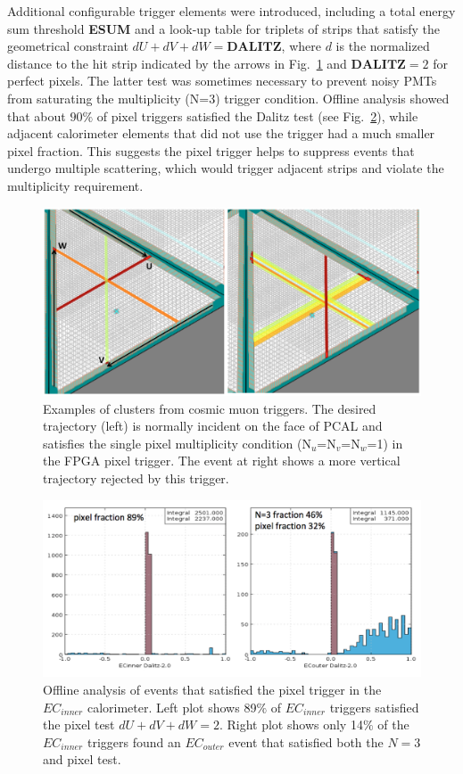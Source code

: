 Additional configurable trigger elements were introduced, including a total energy sum threshold \textbf{ESUM} and a look-up table for triplets of strips that satisfy the geometrical constraint $dU+dV+dW=\textbf{DALITZ}$, where $d$ is the normalized distance to the hit strip indicated by the arrows in Fig.~\ref{fig:pcal_cosmic_1} and $\textbf{DALITZ}=2$ for perfect pixels.  The latter test was sometimes necessary to prevent noisy PMTs from saturating the multiplicity (N=3) trigger condition.  Offline analysis showed that about $90\%$ of pixel triggers satisfied the Dalitz test (see Fig.~\ref{fig:ec_offline}), while adjacent calorimeter elements that did not use the trigger had a much smaller pixel fraction.  This suggests the pixel trigger helps to suppress events that undergo multiple scattering, which would trigger adjacent strips and violate the multiplicity requirement.

\begin{figure}[!htb]
 	\centering
  	\includegraphics[width=0.95\columnwidth,keepaspectratio]{img/TwoClusters.png}
 	\caption{Examples of clusters from cosmic muon triggers.  The desired trajectory (left) is normally incident on the face of PCAL and satisfies the single pixel multiplicity condition (N$_u$=N$_v$=N$_w$=1) in the FPGA pixel trigger. The event at right shows a more vertical trajectory rejected by this trigger.}
	\label{fig:pcal_cosmic_1}
\end{figure}

\begin{figure}[!htb]
 	\centering
  	\includegraphics[width=1.0\columnwidth,keepaspectratio]{img/PixelFraction.png}
 	\caption{Offline analysis of events that satisfied the pixel trigger in the $EC_{inner}$  calorimeter.  Left plot shows 89$\%$ of $EC_{inner}$  triggers satisfied the pixel test $dU+dV+dW=2$.  Right plot shows only 14$\%$ of the $EC_{inner}$ triggers found an $EC_{outer}$ event that satisfied both the $N=3$ and pixel test.}
	\label{fig:ec_offline}
\end{figure}


